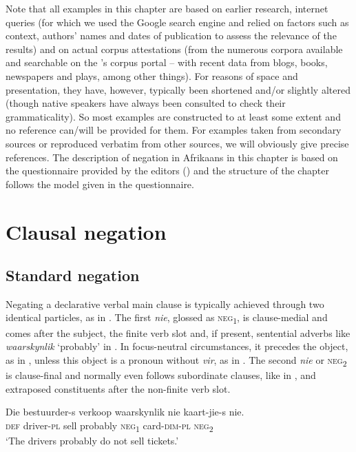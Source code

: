 \documentclass[output=paper,colorlinks,citecolor=brown]{langscibook}
\begin{document}
Note that all examples in this chapter are based on earlier research, internet queries (for which we used the Google search engine and relied on factors such as context, authors’ names and dates of publication to assess the relevance of the results) and on actual corpus attestations (from the numerous corpora available and searchable on the \citeauthor{VirtueleInstituutvirAfrikaans2019}'s \citeyear{VirtueleInstituutvirAfrikaans2019} corpus portal – with recent data from blogs, books, newspapers and plays, among other things). For reasons of space and presentation, they have, however, typically been shortened and/or slightly altered (though native speakers have always been consulted to check their grammaticality). So most examples are constructed to at least some extent and no reference can/will be provided for them. For examples taken from secondary sources or reproduced verbatim from other sources, we will obviously give precise references. The description of negation in Afrikaans in this chapter is based on the questionnaire provided by the editors () and the structure of the chapter follows the model given in the questionnaire.

\section{Clausal negation}
\subsection{Standard negation}
\label{sec:afr:2.1}
Negating a declarative verbal main clause is typically achieved through two identical particles, as in . The first \textit{nie}, glossed as \textsc{neg}\textsubscript{1}, is clause-medial and comes after the subject, the finite verb slot and, if present, sentential adverbs like \textit{waarskynlik} ‘probably’ in . In focus-neutral circumstances, it precedes the object, as in , unless this object is a pronoun without \textit{vir}, as in . The second \textit{nie} or \textsc{neg}\textsubscript{2} is clause-final and normally even follows subordinate clauses, like in , and extraposed constituents after the non-finite verb slot.

\ea\label{ex:afr:3}
    
    \ea\label{ex:afr:3a}
        \gll Die bestuurder-s verkoop waarskynlik nie kaart-jie-s nie. \\ 
             \textsc{def} driver-\textsc{pl} sell probably \textsc{neg}\textsubscript{1} card-\textsc{dim}{}-\textsc{pl}  \textsc{neg}\textsubscript{2} \\
        \glt ‘The drivers probably do not sell tickets.’
    
\end{document}
